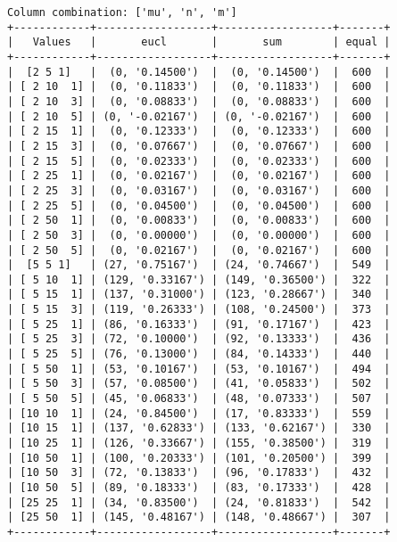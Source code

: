 \documentclass{article}
\begin{document}
\begin{verbatim}
Column combination: ['mu', 'n', 'm']
+------------+------------------+------------------+-------+
|   Values   |       eucl       |       sum        | equal |
+------------+------------------+------------------+-------+
|  [2 5 1]   |  (0, '0.14500')  |  (0, '0.14500')  |  600  |
| [ 2 10  1] |  (0, '0.11833')  |  (0, '0.11833')  |  600  |
| [ 2 10  3] |  (0, '0.08833')  |  (0, '0.08833')  |  600  |
| [ 2 10  5] | (0, '-0.02167')  | (0, '-0.02167')  |  600  |
| [ 2 15  1] |  (0, '0.12333')  |  (0, '0.12333')  |  600  |
| [ 2 15  3] |  (0, '0.07667')  |  (0, '0.07667')  |  600  |
| [ 2 15  5] |  (0, '0.02333')  |  (0, '0.02333')  |  600  |
| [ 2 25  1] |  (0, '0.02167')  |  (0, '0.02167')  |  600  |
| [ 2 25  3] |  (0, '0.03167')  |  (0, '0.03167')  |  600  |
| [ 2 25  5] |  (0, '0.04500')  |  (0, '0.04500')  |  600  |
| [ 2 50  1] |  (0, '0.00833')  |  (0, '0.00833')  |  600  |
| [ 2 50  3] |  (0, '0.00000')  |  (0, '0.00000')  |  600  |
| [ 2 50  5] |  (0, '0.02167')  |  (0, '0.02167')  |  600  |
|  [5 5 1]   | (27, '0.75167')  | (24, '0.74667')  |  549  |
| [ 5 10  1] | (129, '0.33167') | (149, '0.36500') |  322  |
| [ 5 15  1] | (137, '0.31000') | (123, '0.28667') |  340  |
| [ 5 15  3] | (119, '0.26333') | (108, '0.24500') |  373  |
| [ 5 25  1] | (86, '0.16333')  | (91, '0.17167')  |  423  |
| [ 5 25  3] | (72, '0.10000')  | (92, '0.13333')  |  436  |
| [ 5 25  5] | (76, '0.13000')  | (84, '0.14333')  |  440  |
| [ 5 50  1] | (53, '0.10167')  | (53, '0.10167')  |  494  |
| [ 5 50  3] | (57, '0.08500')  | (41, '0.05833')  |  502  |
| [ 5 50  5] | (45, '0.06833')  | (48, '0.07333')  |  507  |
| [10 10  1] | (24, '0.84500')  | (17, '0.83333')  |  559  |
| [10 15  1] | (137, '0.62833') | (133, '0.62167') |  330  |
| [10 25  1] | (126, '0.33667') | (155, '0.38500') |  319  |
| [10 50  1] | (100, '0.20333') | (101, '0.20500') |  399  |
| [10 50  3] | (72, '0.13833')  | (96, '0.17833')  |  432  |
| [10 50  5] | (89, '0.18333')  | (83, '0.17333')  |  428  |
| [25 25  1] | (34, '0.83500')  | (24, '0.81833')  |  542  |
| [25 50  1] | (145, '0.48167') | (148, '0.48667') |  307  |
+------------+------------------+------------------+-------+
\end{verbatim}
\end{document}
